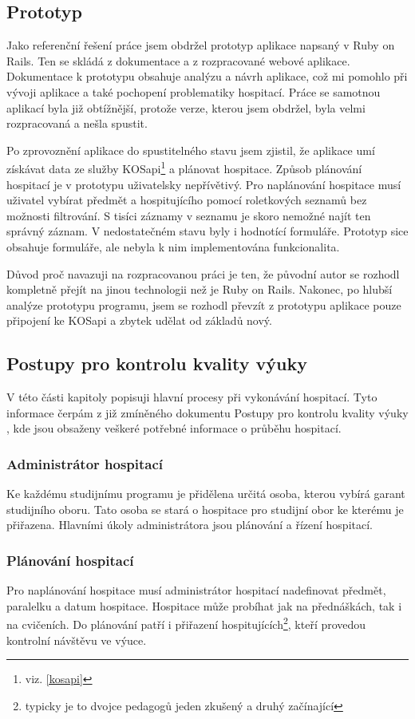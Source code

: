 \subsection{Prototyp}

Jako referenční řešení práce jsem obdržel prototyp aplikace napsaný v Ruby on Rails. Ten se skládá z dokumentace a z rozpracované webové aplikace. Dokumentace k prototypu obsahuje analýzu a návrh aplikace, což  mi pomohlo při vývoji aplikace a také pochopení problematiky hospitací. Práce se samotnou aplikací byla již obtížnější, protože verze, kterou jsem obdržel, byla velmi rozpracovaná a nešla spustit. 

Po zprovoznění aplikace do spustitelného stavu jsem zjistil, že aplikace umí získávat data ze služby KOSapi\footnote{viz. \ref{kosapi}} a plánovat hospitace. Způsob plánování hospitací je v prototypu uživatelsky nepřívětivý. Pro naplánování hospitace musí uživatel vybírat předmět a hospitujícího pomocí roletkových seznamů bez možnosti filtrování. S tisíci záznamy v seznamu je skoro nemožné najít ten správný záznam. V nedostatečném stavu byly i hodnotící formuláře. Prototyp sice obsahuje formuláře, ale nebyla k nim implementována funkcionalita. 

Důvod proč navazuji na rozpracovanou práci je ten, že původní autor se rozhodl kompletně přejít na jinou technologii než je Ruby on Rails. Nakonec, po hlubší analýze prototypu programu, jsem se rozhodl převzít z prototypu aplikace pouze připojení ke KOSapi a zbytek udělat od základů nový. 

\subsection{Postupy pro kontrolu kvality výuky}
V této části kapitoly popisuji hlavní procesy při vykonávání hospitací. Tyto informace čerpám z již zmíněného dokumentu Postupy pro kontrolu kvality výuky \cite{postupy}, kde jsou obsaženy veškeré potřebné informace o průběhu hospitací.

\subsubsection{Administrátor hospitací}
Ke každému studijnímu programu je přidělena určitá osoba, kterou vybírá garant studijního oboru. Tato osoba se stará o hospitace pro studijní obor ke kterému je přiřazena. Hlavními úkoly administrátora jsou plánování a řízení hospitací.

\subsubsection{Plánování hospitací}
Pro naplánování hospitace musí administrátor hospitací nadefinovat předmět, paralelku a datum hospitace. Hospitace může probíhat jak na přednáškách, tak i na cvičeních. Do plánování patří i přiřazení hospitujících\footnote{typicky je to dvojce pedagogů jeden zkušený a druhý začínající}, kteří provedou kontrolní návštěvu ve výuce.

